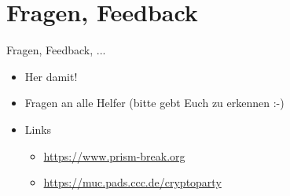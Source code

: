 \section{Fragen, Feedback}
\begin{frame}{Fragen, Feedback, ...}
  \begin{itemize}
    \item{Her damit!}
    \item{Fragen an alle Helfer (bitte gebt Euch zu erkennen :-)}
    \item{Links}
      \begin{itemize}
        \item \url{https://www.prism-break.org}
        \item \url{https://muc.pads.ccc.de/cryptoparty}
      \end{itemize}
  \end{itemize}
\end{frame}

\endinput
